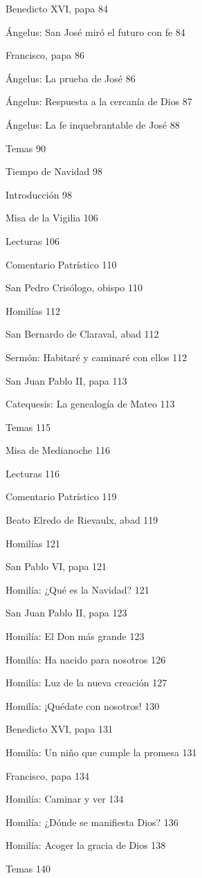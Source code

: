 \documentclass[]{article}
\begin{document}
Benedicto XVI, papa 84

Ángelus: San José miró el futuro con fe 84

Francisco, papa 86

Ángelus: La prueba de José 86

Ángelus: Respuesta a la cercanía de Dios 87

Ángelus: La fe inquebrantable de José 88

Temas 90

Tiempo de Navidad 98

Introducción 98

Misa de la Vigilia 106

Lecturas 106

Comentario Patrístico 110

San Pedro Crisólogo, obispo 110

Homilías 112

San Bernardo de Claraval, abad 112

Sermón: Habitaré y caminaré con ellos 112

San Juan Pablo II, papa 113

Catequesis: La genealogía de Mateo 113

Temas 115

Misa de Medianoche 116

Lecturas 116

Comentario Patrístico 119

Beato Elredo de Rievaulx, abad 119

Homilías 121

San Pablo VI, papa 121

Homilía: ¿Qué es la Navidad? 121

San Juan Pablo II, papa 123

Homilía: El Don más grande 123

Homilía: Ha nacido para nosotros 126

Homilía: Luz de la nueva creación 127

Homilía: ¡Quédate con nosotros! 130

Benedicto XVI, papa 131

Homilía: Un niño que cumple la promesa 131

Francisco, papa 134

Homilía: Caminar y ver 134

Homilía: ¿Dónde se manifiesta Dios? 136

Homilía: Acoger la gracia de Dios 138

Temas 140
\end{document}
